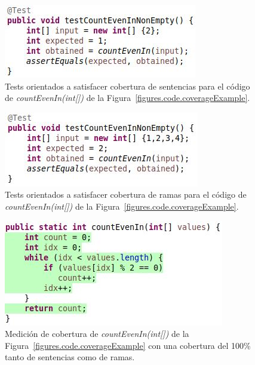
\begin{figure}
	\centering
	\includegraphics[width=.90\linewidth]{figures/stmtCoverageOrientedTests.JPG}
	\caption[Tests (cobertura de sentencias) para \emph{countEvenIn(int[])}]{Tests orientados a satisfacer cobertura de sentencias para el c\'odigo de \emph{countEvenIn(int[])} de la Figura~\ref{figures.code.coverageExample}.}
	\label{figures.examples.coverage.stmtTests}
\end{figure}

\begin{figure}
	\centering
	\includegraphics[width=.90\linewidth]{figures/branchCoverageOrientedTests.JPG}
	\caption[Tests (cobertura de ramas) para \emph{countEvenIn(int[])}]{Tests orientados a satisfacer cobertura de ramas para el c\'odigo de \emph{countEvenIn(int[])} de la Figura~\ref{figures.code.coverageExample}.}
	\label{figures.examples.coverage.branchTests}
\end{figure}

\begin{figure}
	\centering
	\includegraphics[width=.90\linewidth]{figures/branchCoverageExampleComplete.JPG}
	\caption[Cobertura de ramas del 100\% para \emph{countEvenIn(int[])}]{Medici\'on de cobertura de \emph{countEvenIn(int[])} de la Figura~\ref{figures.code.coverageExample} con una cobertura del 100\% tanto de sentencias como de ramas.}
	\label{figures.examples.coverage.fullCoverage}
\end{figure}


